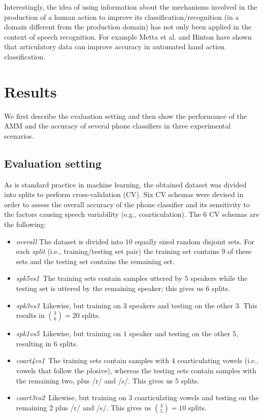 \documentclass[10pt]{article}
\newcommand{\spka}{\emph{spk5vs1}}
\newcommand{\spkb}{\emph{spk3vs3}}
\newcommand{\spkc}{\emph{spk1vs5}}
\newcommand{\coa}{\emph{coart4vs1}}
\newcommand{\cob}{\emph{coart3vs2}}
\begin{document}
Interestingly, the idea of using information about the mechanisms involved in the production of a human action to improve its classification/recognition (in a domain different from the production domain) has not only been applied in the context of speech recognition. For example Metta et al. \cite{metta-06} and Hinton \cite{hinton-2006} 
have shown that articulatory data can improve accuracy in automated hand action classification.

\section*{Results}
We first describe the evaluation setting and then show the performance of the AMM and the accuracy of several phone classifiers in three experimental scenarios. 

\subsection*{Evaluation setting}
\label{subsec:cv}

As is standard practice in machine learning, the obtained dataset was divided into
splits to perform cross-validation (CV). 
Six CV schemas were devised in order to assess the overall accuracy of the phone classifier and its
sensitivity to the factors causing speech variability (e.g., coarticulation). The $6$ CV schemas
are the following:

\begin{itemize}

 \item \emph{overall} The dataset is divided into $10$ equally sized random disjoint sets.
	For each \emph{split} (i.e., training/testing set pair) the training set contains $9$
	of these sets and the testing set contains the remaining set.

  \item \spka\ The training sets contain samples
  	uttered by $5$ speakers while the testing set is
  	uttered by the remaining speaker; this gives us $6$ splits.

  \item \spkb\ Likewise, but training on $3$ speakers and testing on the
  	other $3$. This results in $\binom{3}{6} = 20$ splits.

  \item \spkc\ Likewise, but training on $1$ speaker and testing on the
  	other $5$, resulting in $6$ splits.

  \item \coa\ The training sets contain samples
  	with $4$ coarticulating vowels (i.e., vowels that follow the plosive), whereas the testing sets contain samples
  	with the remaining two, plus /r/ and /s/. This gives us $5$ splits.

  \item \cob\ Likewise, but training on $3$ coarticulating vowels and
  	testing on the remaining $2$ plus /r/ and /s/. This gives us
  	$\binom{3}{5} = 10$ splits.

\end{itemize}
\end{document}
